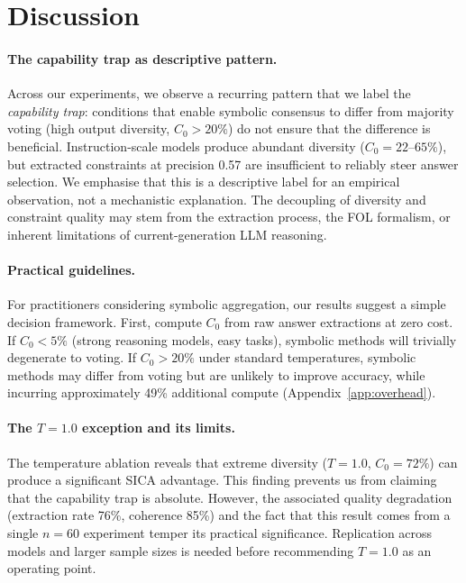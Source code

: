 \documentclass[11pt]{article}
\begin{document}
\section{Discussion}
\label{sec:discussion}

\paragraph{The capability trap as descriptive pattern.}
Across our experiments, we observe a recurring pattern that we label the \emph{capability trap}: conditions that enable symbolic consensus to differ from majority voting (high output diversity, $C_0{>}20\%$) do not ensure that the difference is beneficial.
Instruction-scale models produce abundant diversity ($C_0{=}22$--$65\%$), but extracted constraints at precision 0.57 are insufficient to reliably steer answer selection.
We emphasise that this is a descriptive label for an empirical observation, not a mechanistic explanation.
The decoupling of diversity and constraint quality may stem from the extraction process, the FOL formalism, or inherent limitations of current-generation LLM reasoning.

\paragraph{Practical guidelines.}
For practitioners considering symbolic aggregation, our results suggest a simple decision framework.
First, compute $C_0$ from raw answer extractions at zero cost.
If $C_0{<}5\%$ (strong reasoning models, easy tasks), symbolic methods will trivially degenerate to voting.
If $C_0{>}20\%$ under standard temperatures, symbolic methods may differ from voting but are unlikely to improve accuracy, while incurring approximately 49\% additional compute (Appendix~\ref{app:overhead}).

\paragraph{The $T{=}1.0$ exception and its limits.}
The temperature ablation reveals that extreme diversity ($T{=}1.0$, $C_0{=}72\%$) can produce a significant SICA advantage.
This finding prevents us from claiming that the capability trap is absolute.
However, the associated quality degradation (extraction rate 76\%, coherence 85\%) and the fact that this result comes from a single $n{=}60$ experiment temper its practical significance.
Replication across models and larger sample sizes is needed before recommending $T{=}1.0$ as an operating point.
\end{document}
